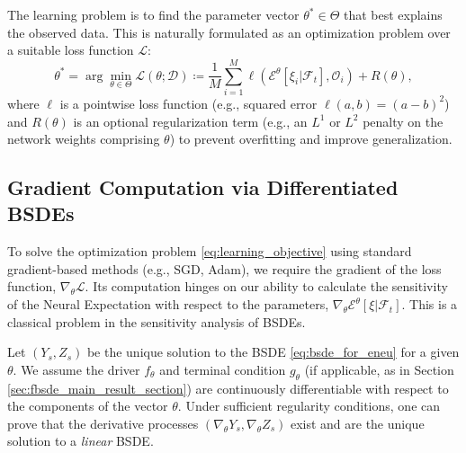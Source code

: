 \documentclass[qian]{imsart}
\newcommand{\Fcal}{\mathcal{F}}
\newcommand{\cEneutheta}{\mathcal{E}^{\theta}}
\theoremstyle{plain}
\theoremstyle{definition}
\begin{document}
The learning problem is to find the parameter vector $\theta^* \in \Theta$ that best explains the observed data. This is naturally formulated as an optimization problem over a suitable loss function $\mathcal{L}$:
\begin{equation}
\label{eq:learning_objective}
    \theta^* = \arg \min_{\theta \in \Theta} \mathcal{L}(\theta; \mathcal{D}) \coloneqq \frac{1}{M} \sum_{i=1}^M \ell\left( \cEneutheta[\xi_i | \Fcal_t], \mathcal{O}_i \right) + R(\theta),
\end{equation}
where $\ell$ is a pointwise loss function (e.g., squared error $\ell(a,b)=(a-b)^2$) and $R(\theta)$ is an optional regularization term (e.g., an $L^1$ or $L^2$ penalty on the network weights comprising $\theta$) to prevent overfitting and improve generalization.

\subsection{Gradient Computation via Differentiated BSDEs}

To solve the optimization problem \eqref{eq:learning_objective} using standard gradient-based methods (e.g., SGD, Adam), we require the gradient of the loss function, $\nabla_\theta \mathcal{L}$. Its computation hinges on our ability to calculate the sensitivity of the Neural Expectation with respect to the parameters, $\nabla_\theta \cEneutheta[\xi | \Fcal_t]$. This is a classical problem in the sensitivity analysis of BSDEs.

Let $(Y_s, Z_s)$ be the unique solution to the BSDE \eqref{eq:bsde_for_eneu} for a given $\theta$. We assume the driver $f_\theta$ and terminal condition $g_\theta$ (if applicable, as in Section \ref{sec:fbsde_main_result_section}) are continuously differentiable with respect to the components of the vector $\theta$. Under sufficient regularity conditions, one can prove that the derivative processes $(\nabla_\theta Y_s, \nabla_\theta Z_s)$ exist and are the unique solution to a \textit{linear} BSDE.
\end{document}
